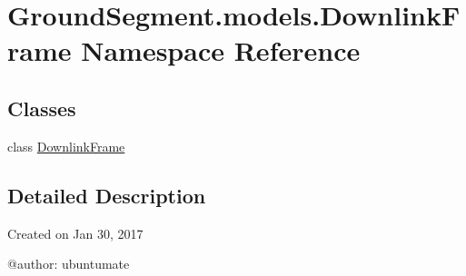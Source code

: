 \hypertarget{namespace_ground_segment_1_1models_1_1_downlink_frame}{}\section{Ground\+Segment.\+models.\+Downlink\+Frame Namespace Reference}
\label{namespace_ground_segment_1_1models_1_1_downlink_frame}
\subsection*{Classes}
\begin{DoxyCompactItemize}
\item 
class \hyperlink{class_ground_segment_1_1models_1_1_downlink_frame_1_1_downlink_frame}{Downlink\+Frame}
\end{DoxyCompactItemize}


\subsection{Detailed Description}
\begin{DoxyVerb}Created on Jan 30, 2017

@author: ubuntumate
\end{DoxyVerb}
 